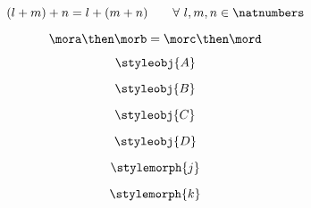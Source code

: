 {\begin{forslides}
        \begin{equation}
            \label{eq:45}
            (l + m) + n = l + (m + n) \quad \quad  \forall \ l, m, n \in \natnumbers
        \end{equation}

        \begin{equation}
            \label{eq:46}
            \mora \then \morb = \morc \then \mord
        \end{equation}

        \begin{equation}
            \label{eq:47}
            \styleobj{A}
        \end{equation}

        \begin{equation}
            \label{eq:48}
            \styleobj{B}
        \end{equation}

        \begin{equation}
            \label{eq:49}
            \styleobj{C}
        \end{equation}

        \begin{equation}
            \label{eq:50}
            \styleobj{D}
        \end{equation}

        \begin{equation}
            \label{eq:51}
            \stylemorph{j}
        \end{equation}

        \begin{equation}
            \label{eq:52}
            \stylemorph{k}
        \end{equation}

    \end{forslides}
}

